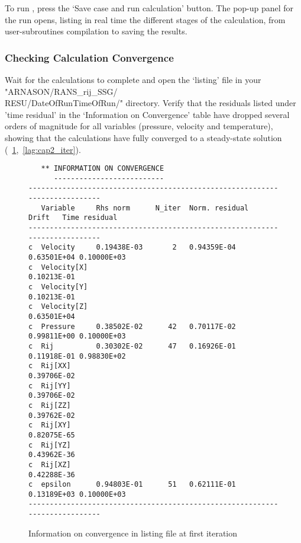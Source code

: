 To run \CS, press the ‘Save case and run calculation’ button.  The pop-up panel for the run opens, listing in real time the different stages of the calculation, from user-subroutines compilation to saving the results.

\subsubsection{Checking Calculation Convergence}

Wait for the calculations to complete and open the ‘listing’ file in your "ARNASON/RANS\_rij\_SSG/\\RESU/DateOfRunTimeOfRun/" directory.  Verify that the residuals listed under 'time residual' in the ‘Information on Convergence’ table have dropped several orders of magnitude for all variables (pressure, velocity and temperature), showing that the calculations have fully converged to a steady-state solution (\figurename~\ref{lag:cap1_iter},~\ref{lag:cap2_iter}).
%
\begin{figure}[H]
\scriptsize{
\begin{lstlisting}
   ** INFORMATION ON CONVERGENCE
      --------------------------
----------------------------------------------------------------------------
   Variable     Rhs norm      N_iter  Norm. residual   Drift   Time residual
----------------------------------------------------------------------------
c  Velocity     0.19438E-03       2   0.94359E-04   0.63501E+04 0.10000E+03 
c  Velocity[X]                                      0.10213E-01 
c  Velocity[Y]                                      0.10213E-01 
c  Velocity[Z]                                      0.63501E+04 
c  Pressure     0.38502E-02      42   0.70117E-02   0.99811E+00 0.10000E+03 
c  Rij          0.30302E-02      47   0.16926E-01   0.11918E-01 0.98830E+02 
c  Rij[XX]                                          0.39706E-02 
c  Rij[YY]                                          0.39706E-02 
c  Rij[ZZ]                                          0.39762E-02 
c  Rij[XY]                                          0.82075E-65 
c  Rij[YZ]                                          0.43962E-36 
c  Rij[XZ]                                          0.42288E-36 
c  epsilon      0.94803E-01      51   0.62111E-01   0.13189E+03 0.10000E+03 
----------------------------------------------------------------------------
\end{lstlisting}}
\caption{Information on convergence in listing file at first iteration}\label{lag:cap1_iter}
\end{figure}
